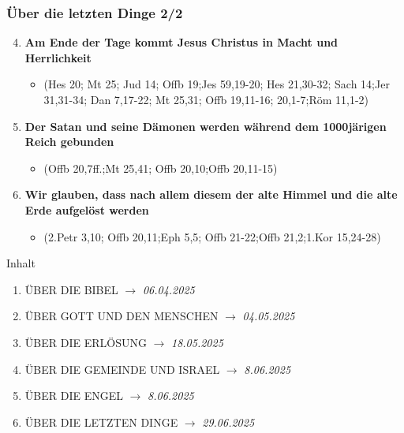 \documentclass[aspectratio=43]{beamer}
\begin{document}
    \begin{frame}
        \frametitle{Über die letzten Dinge 2/2}  %
        \vspace{0.80cm}    
        \begin{enumerate}
            \setcounter{enumi}{3}
            \item \textbf{Am Ende der Tage kommt Jesus Christus in Macht und Herrlichkeit}        
                \begin{itemize}
                    \item (Hes 20; Mt 25; Jud 14; Offb 19;Jes 59,19-20; Hes 21,30-32; Sach 14;Jer 31,31-34; Dan 7,17-22; Mt 25,31; Offb 19,11-16; 20,1-7;Röm 11,1-2)                
                \end{itemize} 
                \vspace{0.2cm}
                \pause
            \item \textbf{Der Satan und seine Dämonen werden während dem 1000järigen Reich gebunden}
                \begin{itemize}
                    \item (Offb 20,7ff.;Mt 25,41; Offb 20,10;Offb 20,11-15)              
                \end{itemize} 
                \vspace{0.2cm}
                \pause
            \item \textbf{Wir glauben, dass nach allem diesem der alte Himmel und die alte Erde aufgelöst werden}
                \begin{itemize}
                    \item (2.Petr 3,10; Offb 20,11;Eph 5,5; Offb 21-22;Offb 21,2;1.Kor 15,24-28)             
                \end{itemize} 
        \end{enumerate}   
    \end{frame}
    \begin{frame}{Inhalt}
    \begin{enumerate}
        \item \uppercase{über die bibel} $\longrightarrow$ \textit{06.04.2025}
        \item \uppercase{über gott und den Menschen} $\longrightarrow$ \textit{04.05.2025}
        \item \uppercase{über die Erlösung} $\longrightarrow$ \textit{18.05.2025}
        \item \uppercase{über die Gemeinde und Israel} $\longrightarrow$ \textit{8.06.2025}
        \item \uppercase{über die Engel} $\longrightarrow$ \textit{8.06.2025}
        \item \uppercase{über die letzten Dinge} $\longrightarrow$ \textit{29.06.2025}
    \end{enumerate}
\end{frame}
\end{document}
